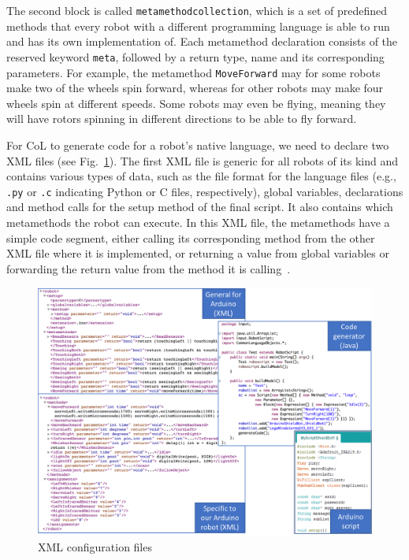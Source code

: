 \documentclass[runningheads]{llncs}
\begin{document}
The second block is called \texttt{metamethodcollection}, which is a set of predefined methods that every robot with a different programming language is able to run and has its own implementation of. 
Each metamethod declaration consists of the reserved keyword \texttt{meta}, followed by a return type, name and its corresponding parameters. 
For example, the metamethod \texttt{MoveForward} may for some robots make two of the wheels spin forward, whereas for other robots may make four wheels spin at different speeds. 
Some robots may even be flying, meaning they will have rotors spinning in different directions to be able to fly forward. 

For CoL to generate code for a robot's native language, we need to declare two XML files (see Fig.~\ref{fig:commonlang-xml}). 
The first XML file is generic for all robots of its kind and contains various types of data, such as the file format for the language files (e.g., \texttt{.py} or \texttt{.c} indicating Python or C files, respectively), global variables, declarations and method calls for the setup method of the final script. 
It also contains which metamethods the robot can execute. 
In this XML file, the metamethods have a simple code segment, either calling its corresponding method from the other XML file where it is implemented, or returning a value from global variables or forwarding the return value from the method it is calling~\cite{gya17}.
\begin{figure}[t]
	\centering
	\includegraphics[width=\linewidth]{images/structure-xml-2.png}
	\caption{XML configuration files}
	\label{fig:commonlang-xml}
    \vspace{-3mm}
\end{figure}
\end{document}
